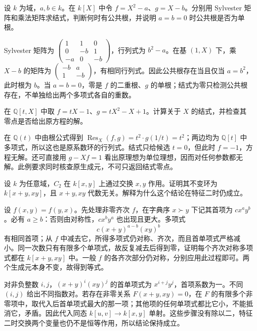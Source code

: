 \begin{exercise}\label{b3:ex:08-resultant-quadratic}
	设 \(k\) 为域，\(a,b\in k\)。在 \(k[X]\) 中令 \(f=X^2-a\)、\(g=X-b\)。分别用 Sylvester 矩阵和乘法矩阵求结式，判断何时有公共根，并说明 \(a=b=0\) 时公共根是否为单根。
\end{exercise}
\begin{solution}
	Sylvester 矩阵为 \(\left(\begin{smallmatrix}1&1&0\\0&-b&1\\-a&0&-b\end{smallmatrix}\right)\)，行列式为 \(b^2-a\)。在基 \((1,X)\) 下，乘 \(X-b\) 的矩阵为 \(\left(\begin{smallmatrix}-b&a\\1&-b\end{smallmatrix}\right)\)，有相同行列式。因此公共根存在当且仅当 \(a=b^2\)，此时根为 \(b\)。当 \(a=b=0\)，零是 \(f\) 的二重根、\(g\) 的单根；结式为零只检测公共根存在，不单独给出两个多项式各自的重数。
\end{solution}

\begin{exercise}\label{b3:ex:08-resultant-degree-drop}
	在 \(\mathbb Q[t,X]\) 中取 \(f=tX-1\)、\(g=tX^2-X+1\)。计算关于 \(X\) 的结式，并检查其零点是否给出原方程的解。
\end{exercise}
\begin{solution}
	在 \(\mathbb Q(t)\) 中由根公式得到 \(\operatorname{Res}_X(f,g)=t^2\cdot g(1/t)=t^2\)；两边均为 \(\mathbb Q[t]\) 中多项式，所以这也是原系数环的行列式。结式只给候选 \(t=0\)，但此时 \(f=-1\)，方程无解。还可直接用 \(g-Xf=1\) 看出原理想为单位理想，因而对任何参数都无解。此例要求同时核查原生成元，不可只返回结式零点。
\end{solution}

\begin{exercise}\label{b3:ex:08-swap-invariants}
	设 \(k\) 为任意域，\(C_2\) 在 \(k[x,y]\) 上通过交换 \(x,y\) 作用。证明其不变环为 \(k[x+y,xy]\)，且 \(x+y,xy\) 代数无关。解释为什么这个结论在特征二时仍成立。
\end{exercise}
\begin{solution}
	设 \(f(x,y)=f(y,x)\)。先处理非零齐次 \(f\)，在字典序 \(x\succ y\) 下记其首项为 \(cx^ay^b\)。必有 \(a\ge b\)：否则由对称性，\(cx^by^a\) 也出现且更大。多项式
	\[
		c(x+y)^{a-b}(xy)^b
	\]
	有相同首项；从 \(f\) 中减去它，所得多项式仍对称、齐次，而且首单项式严格减小。同一次数只有有限多个单项式，故反复减去后得到零，证明每个齐次对称多项式都在 \(k[x+y,xy]\) 中。一般 \(f\) 的各齐次部分仍对称，分别应用此过程即可。两个生成元本身不变，故得到等式。

	对非负整数 \(i,j\)，\((x+y)^i(xy)^j\) 的首单项式为 \(x^{i+j}y^j\)，首项系数为一。不同 \((i,j)\) 给出不同指数对。若存在非零关系 \(F(x+y,xy)=0\)，在 \(F\) 的有限多个非零项中，取代入后首单项式最大的那一项；其他项的任何单项式都比它小，不能抵消它，矛盾。因此代入同态 \(k[u,v]\to k[x,y]\) 单射。这些步骤没有除以二，特征二时交换两个变量也仍不是恒等作用，所以结论保持成立。
\end{solution}

